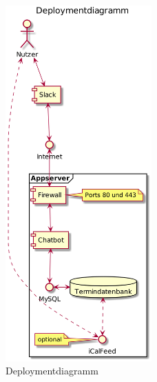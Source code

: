 

\begin{figure}[htbp]
    \centering
    \includegraphics[width=0.5\textwidth]{../docs/uml/architecture.png}
    \caption{Deploymentdiagramm}
    \label{img:deployment}
\end{figure}


